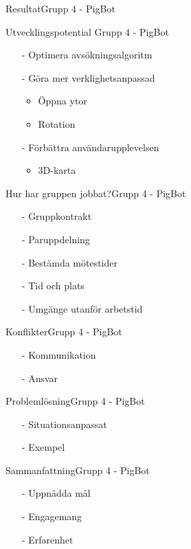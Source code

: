 \begin{frame}{Resultat}{Grupp 4 - PigBot}

\end{frame}


\begin{frame}{Utvecklingspotential }{Grupp 4 - PigBot}

  \begin{itemize}
    \item[-] Optimera avsökningsalgoritm
    \item[-] Göra mer verklighetsanpassad
	\begin{itemize}
	  \item Öppna ytor
	  \item Rotation
	\end{itemize}	
    \item[-] Förbättra användarupplevelsen
     	\begin{itemize}
	  \item 3D-karta
	\end{itemize}
   \end{itemize}
\end{frame}


\begin{frame}{Hur har gruppen jobbat?}{Grupp 4 - PigBot}
  \begin{itemize}
\pause
    \item[-] Gruppkontrakt 
\pause
    \item[-] Paruppdelning
\pause
    \item[-] Bestämda mötestider
\pause
    \item[-] Tid och plats
\pause
    \item[-] Umgänge utanför arbetstid
  \end{itemize}
\end{frame}

\begin{frame}{Konflikter}{Grupp 4 - PigBot}
  \begin{itemize}
 \pause
    \item[-] Kommunikation
\pause
    \item[-] Ansvar
  \end{itemize}
\end{frame}

\begin{frame}{Problemlösning}{Grupp 4 - PigBot}
  \begin{itemize}
 \pause
    \item[-] Situationsanpassat
\pause
    \item[-] Exempel
  \end{itemize}
\end{frame}

\begin{frame}{Sammanfattning}{Grupp 4 - PigBot}
  \begin{itemize}
 \pause
    \item[-] Uppnådda mål
 \pause
    \item[-] Engagemang
  \pause
    \item[-] Erfarenhet
  \end{itemize}
\end{frame}


